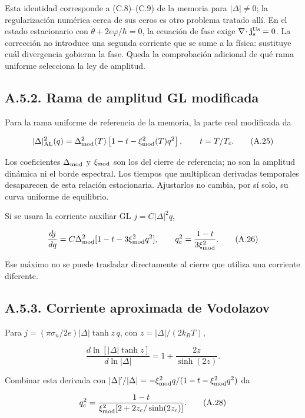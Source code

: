 \documentclass[
  spanish,
  10pt,
  a4paper,
]{article}
\begin{document}
Esta identidad corresponde a (C.8)--(C.9) de la memoria para
\(|\Delta|\ne0\); la regularización numérica cerca de sus ceros es otro
problema tratado allí. En el estado estacionario con
\(\dot\theta+2e\varphi/\hbar=0\), la ecuación de fase exige
\(\nabla\!\cdot\mathbf j_s^{\rm Us}=0\). La corrección no introduce una
segunda corriente que se sume a la física: sustituye cuál divergencia
gobierna la fase. Queda la comprobación adicional de qué rama uniforme
selecciona la ley de amplitud.

\subsection{A.5.2. Rama de amplitud GL
modificada}\label{a.5.2.-rama-de-amplitud-gl-modificada}

Para la rama uniforme de referencia de la memoria, la parte real
modificada da

\[
|\Delta|_{\rm AL}^2(q)
=\Delta_{\rm mod}^2(T)
\left[1-t-\xi_{\rm mod}^2(T)q^2\right],\qquad t=T/T_c.
\tag{A.25}
\]

Los coeficientes \(\Delta_{\rm mod}\) y \(\xi_{\rm mod}\) son los del
cierre de referencia; no son la amplitud dinámica ni el borde espectral.
Los tiempos que multiplican derivadas temporales desaparecen de esta
relación estacionaria. Ajustarlos no cambia, por sí solo, su curva
uniforme de equilibrio.

Si se usara la corriente auxiliar GL \(j=C|\Delta|^2q\),

\[
\frac{dj}{dq}=C\Delta_{\rm mod}^2
[1-t-3\xi_{\rm mod}^2q^2],
\qquad q_c^2=\frac{1-t}{3\xi_{\rm mod}^2}.
\tag{A.26}
\]

Ese máximo no se puede trasladar directamente al cierre que utiliza una
corriente diferente.

\subsection{A.5.3. Corriente aproximada de
Vodolazov}\label{a.5.3.-corriente-aproximada-de-vodolazov}

Para \(j=(\pi\sigma_n/2e)|\Delta|\tanh z\,q\), con
\(z=|\Delta|/(2k_BT)\),

\[
\frac{d\ln[|\Delta|\tanh z]}{d\ln|\Delta|}
=1+\frac{2z}{\sinh(2z)}.
\tag{A.27}
\]

Combinar esta derivada con
\(|\Delta|' /|\Delta|=-\xi_{\rm mod}^2q/(1-t-\xi_{\rm mod}^2q^2)\) da

\[
q_c^2=\frac{1-t}{\xi_{\rm mod}^2
[2+2z_c/\sinh(2z_c)]}.
\tag{A.28}
\]
\end{document}

